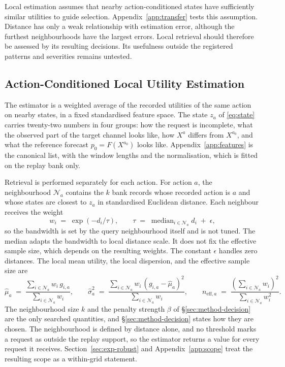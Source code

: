 \documentclass{article}
\newcommand{\calN}{\mathcal{N}}
\begin{document}
Local estimation assumes that nearby action-conditioned states have sufficiently similar
utilities to guide selection. Appendix~\ref{app:transfer} tests this assumption. Distance has
only a weak relationship with estimation error, although the furthest neighbourhoods have the
largest errors. Local retrieval should therefore be assessed by its resulting decisions.
Its usefulness outside the registered patterns and severities remains untested.

\subsection{Action-Conditioned Local Utility Estimation}
\label{sec:method-scoring}
The estimator is a weighted average of the recorded utilities of the same action on nearby
states, in a fixed standardised feature space. The state $z_a$ of \eqref{eq:state} carries
twenty-two numbers in four groups: how the request is incomplete, what the observed part of the
target channel looks like, how $X^{a}$ differs from $X^{a_0}$, and what the reference forecast
$p_0 = F(X^{a_0})$ looks like. Appendix~\ref{app:features} is the canonical list, with the
window lengths and the normalisation, which is fitted on the replay bank only.

Retrieval is performed separately for each action. For action $a$, the neighbourhood
$\calN_a$ contains the $k$ bank records whose recorded action is $a$ and whose states are
closest to $z_a$ in standardised Euclidean distance. Each neighbour receives the weight
\begin{equation}
  w_i \;=\; \exp\!\left(-d_i / \tau\right),
  \qquad
  \tau \;=\; \operatorname{median}_{i \in \calN_a} d_i \;+\; \epsilon ,
  \label{eq:weights}
\end{equation}
so the bandwidth is set by the query neighbourhood itself and is not tuned. The median adapts the bandwidth to local distance scale. It does not fix the effective sample
size, which depends on the resulting weights. The constant $\epsilon$ handles zero distances. The local mean
utility, the local dispersion, and the effective sample size are
\begin{equation}
  \hat\mu_a \;=\; \frac{\sum_{i \in \calN_a} w_i\, g_{i,a}}{\sum_{i \in \calN_a} w_i},
  \qquad
  \hat\sigma_a^{2} \;=\; \frac{\sum_{i \in \calN_a} w_i\, (g_{i,a} - \hat\mu_a)^{2}}{\sum_{i \in \calN_a} w_i},
  \qquad
  n_{\mathrm{eff},a} \;=\; \frac{\left(\sum_{i \in \calN_a} w_i\right)^{2}}{\sum_{i \in \calN_a} w_i^{2}} .
  \label{eq:local-moments}
\end{equation}
The neighbourhood size $k$ and the penalty strength $\beta$ of \S\ref{sec:method-decision} are
the only searched quantities, and \S\ref{sec:method-decision} states how they are chosen. The
neighbourhood is defined by distance alone, and no threshold marks a request as outside the
replay support, so the estimator returns a value for every request it receives.
Section~\ref{sec:exp-robust} and Appendix~\ref{app:scope} treat the resulting scope as a
within-grid statement.
\end{document}

